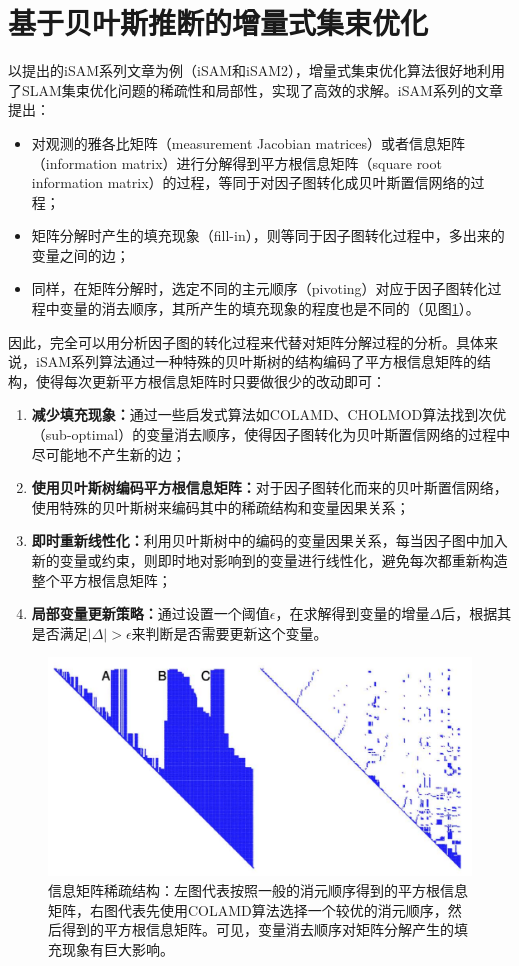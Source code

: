 \section{基于贝叶斯推断的增量式集束优化}

以\citeauthor{kaess2008isam}提出的iSAM系列文章为例（iSAM\citep{kaess2008isam}和iSAM2\citep{kaess2012isam2}），增量式集束优化算法很好地利用了SLAM集束优化问题的稀疏性和局部性，实现了高效的求解。iSAM系列的文章提出：
\begin{itemize}
    \item 对观测的雅各比矩阵（measurement Jacobian matrices）或者信息矩阵（information matrix）进行分解得到平方根信息矩阵（square root information matrix）的过程，等同于对因子图转化成贝叶斯置信网络的过程；
    \item 矩阵分解时产生的填充现象（fill-in），则等同于因子图转化过程中，多出来的变量之间的边；
    \item 同样，在矩阵分解时，选定不同的主元顺序（pivoting）对应于因子图转化过程中变量的消去顺序，其所产生的填充现象的程度也是不同的（见图\ref{fig:fill_in}）。
\end{itemize}

因此，完全可以用分析因子图的转化过程来代替对矩阵分解过程的分析。具体来说，iSAM系列算法通过一种特殊的贝叶斯树的结构编码了平方根信息矩阵的结构，使得每次更新平方根信息矩阵时只要做很少的改动即可：
\begin{enumerate}
    \item \textbf{减少填充现象：}通过一些启发式算法如COLAMD\citep{davis2004algorithm}、CHOLMOD\citep{chen2008algorithm}算法找到次优（sub-optimal）的变量消去顺序，使得因子图转化为贝叶斯置信网络的过程中尽可能地不产生新的边；
    \item \textbf{使用贝叶斯树编码平方根信息矩阵：}对于因子图转化而来的贝叶斯置信网络，使用特殊的贝叶斯树来编码其中的稀疏结构和变量因果关系；
    \item \textbf{即时重新线性化：}利用贝叶斯树中的编码的变量因果关系，每当因子图中加入新的变量或约束，则即时地对影响到的变量进行线性化，避免每次都重新构造整个平方根信息矩阵；
    \item \textbf{局部变量更新策略：}通过设置一个阈值$\epsilon$，在求解得到变量的增量$\Delta$后，根据其是否满足$|\Delta|>\epsilon$来判断是否需要更新这个变量。
\end{enumerate}

\begin{figure}[htbp]
    \centering
    \includegraphics[width=.8\textwidth]{./figs/sparse_pattern.png}
    \caption{信息矩阵稀疏结构\citep{kaess2008isam}：左图代表按照一般的消元顺序得到的平方根信息矩阵，右图代表先使用COLAMD算法选择一个较优的消元顺序，然后得到的平方根信息矩阵。可见，变量消去顺序对矩阵分解产生的填充现象有巨大影响。}
    \label{fig:fill_in}
\end{figure}
